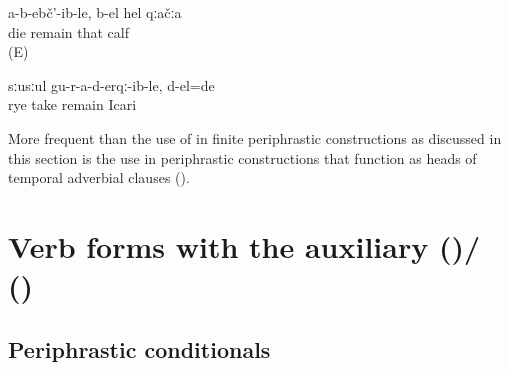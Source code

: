 \begin{exe}
	\ex	\label{ex:The calf, not having died, is alive b-el}
	\gll	a-b-ebč'-ib-le,	b-el	hel	qːačːa\\
		die	remain	that	calf\\
	\glt	{} (E)
	
	\ex	\label{ex:The rye was still not taken to Icari (it was left untaken) b-el}
	\gll	sːusːul	gu-r-a-d-erqː-ib-le,	d-el=de	\\
		rye	take	remain	Icari\\
	\glt	{}
\end{exe}



More frequent than the use of  in finite periphrastic constructions as discussed in this section is the use in periphrastic constructions that function as heads of temporal adverbial clauses ().



\section{Verb forms with the auxiliary \protect{} (\protect{})/\protect{} (\protect{}) \protect{}}
\label{sec:Verb forms with the auxiliary b-irxw- (ipfv) / b-ixw- (pfv) be, become, be able}



\subsection{Periphrastic conditionals}
\label{ssec:Periphrastic conditionals}

